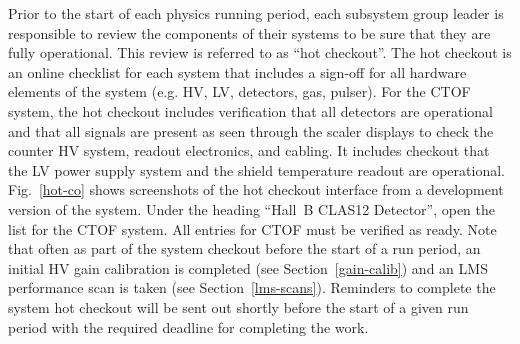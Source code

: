\documentclass[12pt]{article}
\begin{document}
Prior to the start of each physics running period, each subsystem group leader is responsible to
review the components of their systems to be sure that they are fully operational. This review is
referred to as ``hot checkout''. The hot checkout is an online checklist for each system that
includes a sign-off for all hardware elements of the system (e.g. HV, LV, detectors, gas, pulser).
For the CTOF system, the hot checkout includes verification that all detectors are operational and
that all signals are present as seen through the scaler displays to check the counter HV system,
readout electronics, and cabling. It includes checkout that the LV power supply system and the 
shield temperature readout are operational. Fig.~\ref{hot-co} shows screenshots of the hot checkout 
interface from a development version of the system. Under the heading ``Hall~B CLAS12 Detector'', 
open the list for the CTOF system. All entries for CTOF must be verified as ready. Note that often 
as part of the system checkout before the start of a run period, an initial HV gain calibration is 
completed (see Section~\ref{gain-calib}) and an LMS performance scan is taken (see 
Section~\ref{lms-scans}). Reminders to complete the system hot checkout will be sent out shortly 
before the start of a given run period with the required deadline for completing the work.
\end{document}
